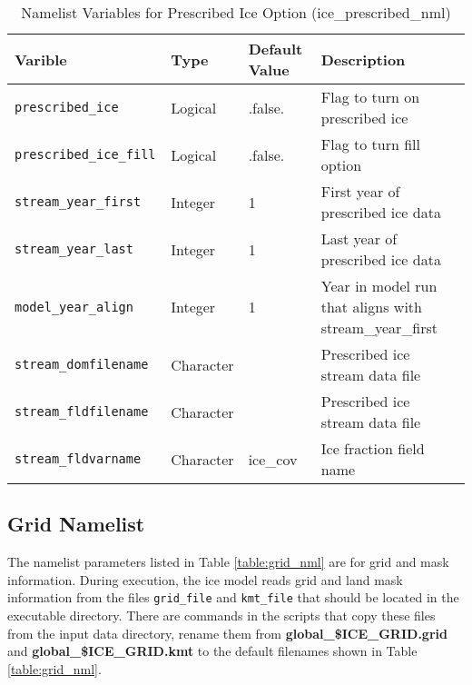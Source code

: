 \begin{table}
  \begin{center}
  \caption{Namelist Variables for Prescribed Ice Option (ice_prescribed_nml)}
  \label{table:ice_prescribed_nml}
  \begin{tabular}{p{4.0cm}p{2.0cm}p{3cm}p{6.0cm}} \hline
  Varible & Type & Default Value & Description               \\
\hline \hline

{\tt prescribed\_ice} & Logical & .false. &  Flag to turn on prescribed ice \\

{\tt prescribed\_ice\_fill } & Logical & .false. &  Flag to turn fill option \\

{\tt stream\_year\_first } & Integer & 1 & First year of prescribed ice data \\

{\tt stream\_year\_last } & Integer & 1 & Last year of prescribed ice data \\

{\tt model\_year\_align } & Integer & 1 & Year in model run that aligns with stream\_year\_first \\

{\tt stream\_domfilename } & Character & & Prescribed ice stream data file \\

{\tt stream\_fldfilename } & Character & & Prescribed ice stream data file \\

{\tt stream\_fldvarname } & Character &  ice\_cov &  Ice fraction field name \\

  \hline
  \end{tabular}
  \end{center}
\end{table}

\subsection{Grid Namelist}

The namelist parameters listed in Table \ref{table:grid_nml} are for
grid and mask information.  During execution, the ice model reads grid and 
land mask information from the files {\tt grid\_file} and {\tt kmt\_file} that 
should be located in the executable directory. There are commands in the 
scripts that copy these files from the input data directory, rename them from 
{\bf global\_\${ICE\_GRID}.grid} and {\bf global\_\${ICE\_GRID}.kmt} to the
default filenames shown in Table \ref{table:grid_nml}.


